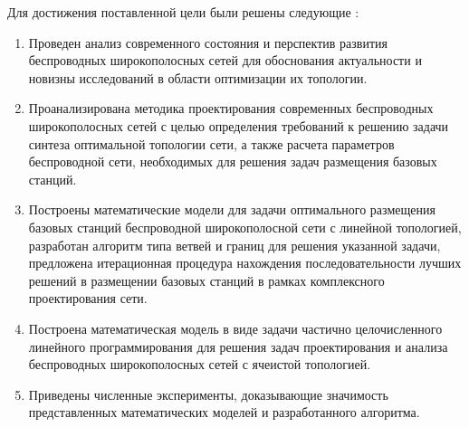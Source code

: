 Для достижения поставленной цели были решены следующие {\tasks}:
\begin{enumerate}[beginpenalty=10000] %
  \item Проведен анализ современного состояния и перспектив развития беспроводных широкополосных сетей для обоснования  актуальности и новизны исследований в области оптимизации их топологии. 
  \item Проанализирована методика проектирования современных беспроводных широкополосных сетей с целью определения требований к решению задачи синтеза оптимальной топологии сети, а также расчета параметров беспроводной сети, необходимых для решения задач размещения базовых станций.
  \item Построены математические модели для задачи оптимального размещения базовых станций беспроводной широкополосной сети с линейной топологией, разработан алгоритм типа ветвей и границ для решения указанной задачи, предложена итерационная процедура нахождения последовательности лучших решений в размещении базовых станций в рамках комплексного проектирования сети.
  \item Построена математическая модель в виде задачи частично целочисленного линейного программирования для решения задач проектирования и анализа беспроводных широкополосных сетей с ячеистой топологией.
  \item Приведены численные эксперименты, доказывающие значимость представленных математических моделей и разработанного алгоритма.

\end{enumerate}

 

